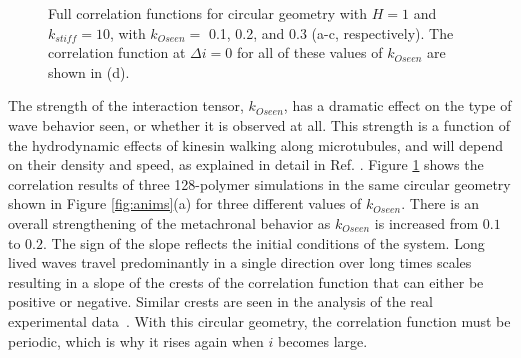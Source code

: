\documentclass[11pt]{ucthesis}
\begin{document}
\begin{figure}
{}
\qquad
{}
\caption{Full correlation functions for circular geometry with $H=1$
and $k_{stiff}=10$, with $k_{Oseen}=$ 0.1, 0.2, and 0.3 (a-c,
respectively). The correlation function at $\Delta i = 0$ for all
of these values of $k_{Oseen}$ are shown in (d).  
\label{fig:oseenk}
}
\end{figure}
The strength of the interaction tensor, $k_{Oseen}$, has a dramatic
effect on the type of wave behavior seen, or whether it is observed
at all. This strength is a function of the hydrodynamic effects of
kinesin walking along microtubules, and will depend on their density
and speed, as explained in detail in Ref. \cite{Monteith2016}. 
Figure \ref{fig:oseenk} shows the correlation results of
three 128-polymer simulations in the same circular geometry shown
in Figure \ref{fig:anims}(a) for three different values of $k_{Oseen}$.
There is an overall strengthening of the metachronal
behavior as $k_{Oseen}$ is increased from  $0.1$ to $0.2$. 
The sign of the slope reflects the initial conditions of the system.
Long lived waves travel predominantly in a single direction over
long times scales resulting in a 
slope of the crests of the correlation function that can
either be positive or negative. Similar crests are
seen in the analysis of the real experimental data~\cite{Sanchez2011}.
With this circular geometry, the correlation function must be periodic,
which is why it rises again when $i$ becomes large.
\end{document}

